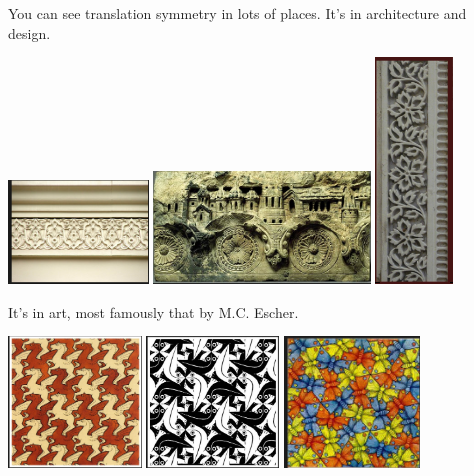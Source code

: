 \documentclass[12pt, reqno]{amsart}
\theoremstyle{remark}
\theoremstyle{definition}
\numberwithin{equation}{section}  %
\begin{document}
You can see translation symmetry in lots of places.  It's in architecture and design.
\begin{center}
\includegraphics[height=2.75cm]{frieze1}
\quad
\includegraphics[height=3cm]{frieze2}
\quad
\includegraphics[height=6cm]{frieze5}

\end{center}



\noindent
It's in art, most famously that by M.C. Escher.

\begin{center}
\includegraphics[height=3.5cm]{escher1}
\quad
\includegraphics[height=3.5cm]{escher2}
\quad
\includegraphics[height=3.5cm]{escher4}

\end{center}
\end{document}
